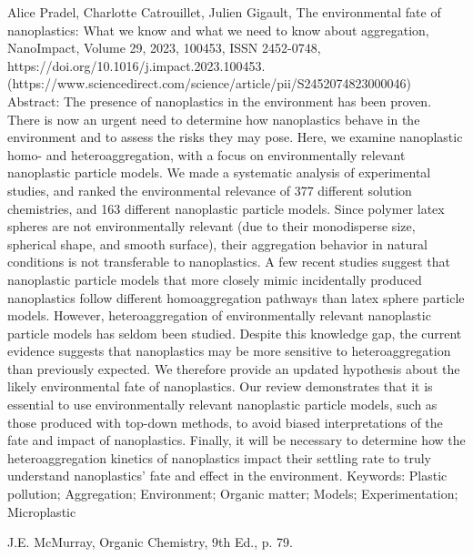 \documentclass[twocolumn,a4paper,aps,amsmath,amssymb,floatfix,superscriptaddress]{revtex4-2}
\begin{document}
\begin{thebibliography}{10}
		Alice Pradel, Charlotte Catrouillet, Julien Gigault,
		The environmental fate of nanoplastics: What we know and what we need to know about aggregation,
		NanoImpact,
		Volume 29,
		2023,
		100453,
		ISSN 2452-0748,
		https://doi.org/10.1016/j.impact.2023.100453.
		(https://www.sciencedirect.com/science/article/pii/S2452074823000046)
		Abstract: The presence of nanoplastics in the environment has been proven. There is now an urgent need to determine how nanoplastics behave in the environment and to assess the risks they may pose. Here, we examine nanoplastic homo- and heteroaggregation, with a focus on environmentally relevant nanoplastic particle models. We made a systematic analysis of experimental studies, and ranked the environmental relevance of 377 different solution chemistries, and 163 different nanoplastic particle models. Since polymer latex spheres are not environmentally relevant (due to their monodisperse size, spherical shape, and smooth surface), their aggregation behavior in natural conditions is not transferable to nanoplastics. A few recent studies suggest that nanoplastic particle models that more closely mimic incidentally produced nanoplastics follow different homoaggregation pathways than latex sphere particle models. However, heteroaggregation of environmentally relevant nanoplastic particle models has seldom been studied. Despite this knowledge gap, the current evidence suggests that nanoplastics may be more sensitive to heteroaggregation than previously expected. We therefore provide an updated hypothesis about the likely environmental fate of nanoplastics. Our review demonstrates that it is essential to use environmentally relevant nanoplastic particle models, such as those produced with top-down methods, to avoid biased interpretations of the fate and impact of nanoplastics. Finally, it will be necessary to determine how the heteroaggregation kinetics of nanoplastics impact their settling rate to truly understand nanoplastics' fate and effect in the environment.
		Keywords: Plastic pollution; Aggregation; Environment; Organic matter; Models; Experimentation; Microplastic
		
		J.E. McMurray, Organic Chemistry, 9th Ed., p. 79.
		
		
		
	\end{thebibliography}
	
\end{document}
